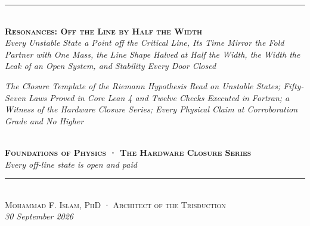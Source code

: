\documentclass[10pt]{article}
\begin{document}
\begin{center}
{\color{accent}\rule{0.6\textwidth}{0.8pt}}\\[10pt]
{\bfseries\scshape\fontsize{19}{23}\selectfont Resonances: Off the Line
by Half the Width}\\[7pt]
{\itshape\large Every Unstable State a Point off the Critical Line, Its
Time Mirror the Fold Partner with One Mass, the Line Shape Halved at
Half the Width, the Width the Leak of an Open System, and Stability
Every Door Closed}\\[6pt]
\parbox{0.86\textwidth}{\centering\small\itshape\color{faint} The
Closure Template of the Riemann Hypothesis Read on Unstable States;
Fifty-Seven Laws Proved in Core Lean 4 and Twelve Checks Executed in
Fortran; a Witness of the Hardware Closure Series; Every Physical Claim
at Corroboration Grade and No Higher}\\[8pt]
{\footnotesize\color{accent}\scshape\bfseries Foundations of Physics ·
The Hardware Closure Series}\\[3pt]
{\itshape\color{deep}\small Every off-line state is open and
paid}\\[9pt]
{\color{accent}\rule{0.6\textwidth}{0.8pt}}\\[10pt]
{\scshape Mohammad F. Islam, PhD · Architect of the Trisduction}\\[2pt]

{\itshape\color{faint}\small 30 September 2026}\\[12pt]
\end{center}
\noindent{\color{accent}\rule{\textwidth}{0.6pt}}\\[2pt]
\end{document}
